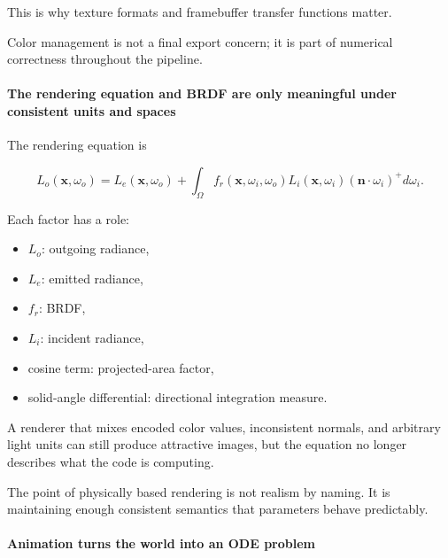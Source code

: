 This is why texture formats and framebuffer transfer functions matter.

Color management is not a final export concern; it is part of numerical correctness throughout the pipeline.

\paragraph{The rendering equation and BRDF are only meaningful under consistent units and spaces}\label{03-visual-computing-i-ch001-the-rendering-equation-and-brdf-are-only-meaningful-under-consistent-units-and-spaces}

\hypertarget{03-visual-computing-i-ch001-the-rendering-equation-and-brdf-are-only-meaningful-under-consistent-units-and-spaces}{}

The rendering equation is

\[
L_o(\mathbf x,\omega_o)
=
L_e(\mathbf x,\omega_o)
+
\int_{\Omega}
f_r(\mathbf x,\omega_i,\omega_o)
L_i(\mathbf x,\omega_i)
(\mathbf n\cdot\omega_i)^+
d\omega_i.
\]

Each factor has a role:

\begin{itemize}
\tightlist
\item
  \(L_o\): outgoing radiance,
\item
  \(L_e\): emitted radiance,
\item
  \(f_r\): BRDF,
\item
  \(L_i\): incident radiance,
\item
  cosine term: projected-area factor,
\item
  solid-angle differential: directional integration measure.
\end{itemize}

A renderer that mixes encoded color values, inconsistent normals, and arbitrary light units can still produce attractive images, but the equation no longer describes what the code is computing.

The point of physically based rendering is not realism by naming. It is maintaining enough consistent semantics that parameters behave predictably.

\paragraph{Animation turns the world into an ODE problem}\label{03-visual-computing-i-ch001-animation-turns-the-world-into-an-ode-problem}

